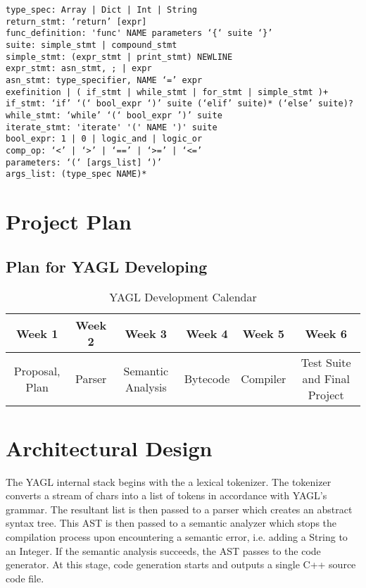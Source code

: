 \documentclass[12pt]{article}
\begin{document}
\begin{lstlisting}
type_spec: Array | Dict | Int | String
return_stmt: ‘return’ [expr]
func_definition: 'func' NAME parameters ‘{‘ suite ‘}’
suite: simple_stmt | compound_stmt
simple_stmt: (expr_stmt | print_stmt) NEWLINE
expr_stmt: asn_stmt, ; | expr 
asn_stmt: type_specifier, NAME ‘=’ expr
exefinition | ( if_stmt | while_stmt | for_stmt | simple_stmt )+
if_stmt: ‘if’ ‘(‘ bool_expr ‘)’ suite (‘elif’ suite)* (‘else’ suite)?
while_stmt: ‘while’ ‘(‘ bool_expr ’)’ suite
iterate_stmt: 'iterate' '(' NAME ')' suite
bool_expr: 1 | 0 | logic_and | logic_or 
comp_op: ‘<’ | ‘>’ | ‘==’ | ‘>=’ | ‘<=’
parameters: ‘(‘ [args_list] ‘)’
args_list: (type_spec NAME)*
\end{lstlisting}

\section{Project Plan}
\subsection{Plan for YAGL Developing }
\begin{table}[H]
\caption{YAGL Development Calendar}
\centering
\begin{tabular}{c c c c c c}

\textbf{Week 1} & \textbf{Week 2} & \textbf{Week 3} & \textbf{Week 4} & \textbf{Week 5} & \textbf{Week 6}\\ [0.5ex] %
\hline
Proposal, Plan&Parser&Semantic Analysis&Bytecode&Compiler&Test Suite and Final Project \\

\hline
\end{tabular}
\end{table}
\section{Architectural Design}
The YAGL internal stack begins with the a lexical tokenizer. The tokenizer converts a stream of chars into a 
list of tokens in accordance with YAGL's grammar. The resultant list is then passed to a parser which creates an 
abstract syntax tree. This AST is then passed to a 
semantic analyzer which stops the compilation process
upon encountering a semantic error, i.e. adding a String to an Integer. If the semantic analysis succeeds, the AST 
passes to the code generator. At this stage, code generation starts and outputs a single C++ source code file. 
\end{document}
